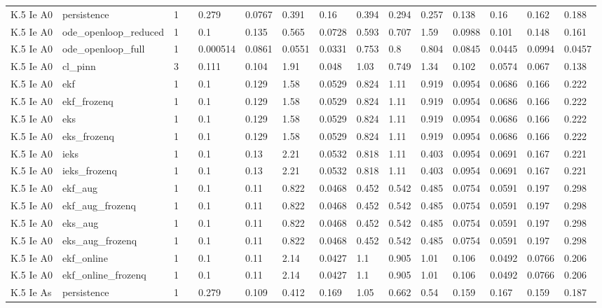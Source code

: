 \begin{table}[t]
\begin{tabular}{lllllllllllllll}
K.5 Ie A0 & persistence & 1 &  & 0.279 & 0.0767 & 0.391 & 0.16 & 0.394 & 0.294 & 0.257 & 0.138 & 0.16 & 0.162 & 0.188 \\
K.5 Ie A0 & ode\_openloop\_reduced & 1 &  & 0.1 & 0.135 & 0.565 & 0.0728 & 0.593 & 0.707 & 1.59 & 0.0988 & 0.101 & 0.148 & 0.161 \\
K.5 Ie A0 & ode\_openloop\_full & 1 &  & 0.000514 & 0.0861 & 0.0551 & 0.0331 & 0.753 & 0.8 & 0.804 & 0.0845 & 0.0445 & 0.0994 & 0.0457 \\
K.5 Ie A0 & cl\_pinn & 3 &  & 0.111 & 0.104 & 1.91 & 0.048 & 1.03 & 0.749 & 1.34 & 0.102 & 0.0574 & 0.067 & 0.138 \\
K.5 Ie A0 & ekf & 1 &  & 0.1 & 0.129 & 1.58 & 0.0529 & 0.824 & 1.11 & 0.919 & 0.0954 & 0.0686 & 0.166 & 0.222 \\
K.5 Ie A0 & ekf\_frozenq & 1 &  & 0.1 & 0.129 & 1.58 & 0.0529 & 0.824 & 1.11 & 0.919 & 0.0954 & 0.0686 & 0.166 & 0.222 \\
K.5 Ie A0 & eks & 1 &  & 0.1 & 0.129 & 1.58 & 0.0529 & 0.824 & 1.11 & 0.919 & 0.0954 & 0.0686 & 0.166 & 0.222 \\
K.5 Ie A0 & eks\_frozenq & 1 &  & 0.1 & 0.129 & 1.58 & 0.0529 & 0.824 & 1.11 & 0.919 & 0.0954 & 0.0686 & 0.166 & 0.222 \\
K.5 Ie A0 & ieks & 1 &  & 0.1 & 0.13 & 2.21 & 0.0532 & 0.818 & 1.11 & 0.403 & 0.0954 & 0.0691 & 0.167 & 0.221 \\
K.5 Ie A0 & ieks\_frozenq & 1 &  & 0.1 & 0.13 & 2.21 & 0.0532 & 0.818 & 1.11 & 0.403 & 0.0954 & 0.0691 & 0.167 & 0.221 \\
K.5 Ie A0 & ekf\_aug & 1 &  & 0.1 & 0.11 & 0.822 & 0.0468 & 0.452 & 0.542 & 0.485 & 0.0754 & 0.0591 & 0.197 & 0.298 \\
K.5 Ie A0 & ekf\_aug\_frozenq & 1 &  & 0.1 & 0.11 & 0.822 & 0.0468 & 0.452 & 0.542 & 0.485 & 0.0754 & 0.0591 & 0.197 & 0.298 \\
K.5 Ie A0 & eks\_aug & 1 &  & 0.1 & 0.11 & 0.822 & 0.0468 & 0.452 & 0.542 & 0.485 & 0.0754 & 0.0591 & 0.197 & 0.298 \\
K.5 Ie A0 & eks\_aug\_frozenq & 1 &  & 0.1 & 0.11 & 0.822 & 0.0468 & 0.452 & 0.542 & 0.485 & 0.0754 & 0.0591 & 0.197 & 0.298 \\
K.5 Ie A0 & ekf\_online & 1 &  & 0.1 & 0.11 & 2.14 & 0.0427 & 1.1 & 0.905 & 1.01 & 0.106 & 0.0492 & 0.0766 & 0.206 \\
K.5 Ie A0 & ekf\_online\_frozenq & 1 &  & 0.1 & 0.11 & 2.14 & 0.0427 & 1.1 & 0.905 & 1.01 & 0.106 & 0.0492 & 0.0766 & 0.206 \\
K.5 Ie As & persistence & 1 &  & 0.279 & 0.109 & 0.412 & 0.169 & 1.05 & 0.662 & 0.54 & 0.159 & 0.167 & 0.159 & 0.187 \\

\end{tabular}
\end{table}
